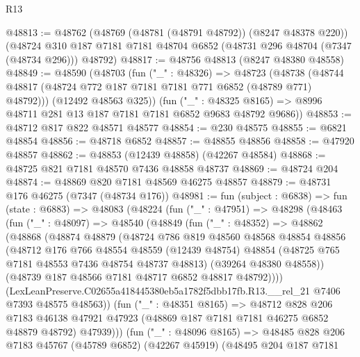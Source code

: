 \begin{lexlean}{R13}
\begin{coremodule}
@48813 := @48762
    (@48769 (@48781 (@48791 @48792)) (@8247 @48378 @220))
    (@48724 @310 @187 @7181 @7181 @48704 @6852 (@48731 @296 @48704 (@7347 (@48734 @296))) @48792)
@48817 := @48756 @48813 (@8247 @48380 @48558)
@48849 := @48590
    (@48703
      (fun ("_" : @48326) =>
      @48723
        (@48738 (@48744 @48817 (@48724 @772 @187 @7181 @7181 @771 @6852 (@48789 @771) @48792)))
        (@12492 @48563 @325))
      (fun ("_" : @48325 @8165) => @8996 @48711 @281 @13 @187 @7181 @7181 @6852 @9683 @48792 @9686))
@48853 := @48712 @817 @822 @48571 @48577
@48854 := @230 @48575
@48855 := @6821 @48854
@48856 := @48718 @6852
@48857 := @48855 @48856
@48858 := @47920 @48857
@48862 := @48853 (@12439 @48858) (@42267 @48584)
@48868 := @48725 @821 @7181 @48570 @7436 @48858 @48737
@48869 := @48724 @204
@48874 := @48869 @820 @7181 @48569 @46275 @48857
@48879 := @48731 @176 @46275 (@7347 (@48734 @176))
@48981 := fun (subject : @6838) =>
  fun (state : @6883) =>
  @48083
    (@48224
      (fun ("_" : @47951) =>
      @48298
        (@48463
          (fun ("_" : @48097) =>
          @48540
            (@48849
              (fun ("_" : @48352) =>
              @48862
                (@48868
                  (@48874
                    @48879
                    (@48724
                      @786
                      @819
                      @48560
                      @48568
                      @48854
                      @48856
                      (@48712
                        @176
                        @766
                        @48554
                        @48559
                        (@12439 @48754)
                        @48854
                        (@48725 @765 @7181 @48553 @7436 @48754 @48737 @48813)
                        (@39264 @48380 @48558))
                      (@48739 @187 @48566 @7181 @48717 @6852 @48817 @48792))))
                (LexLeanPreserve.C02655a418445380eb5a1782f5dbb17fb.R13.__rel_21
                  @7406
                  @7393
                  @48575
                  @48563))
              (fun ("_" : @48351 @8165) =>
              @48712
                @828
                @206
                @7183
                @46138
                @47921
                @47923
                (@48869 @187 @7181 @7181 @46275 @6852 @48879 @48792)
                @47939)))
          (fun ("_" : @48096 @8165) =>
          @48485
            @828
            @206
            @7183
            @45767
            (@45789 @6852)
            (@42267 @45919)
            (@48495
              @204
              @187
              @7181

\end{coremodule}
\end{lexlean}
